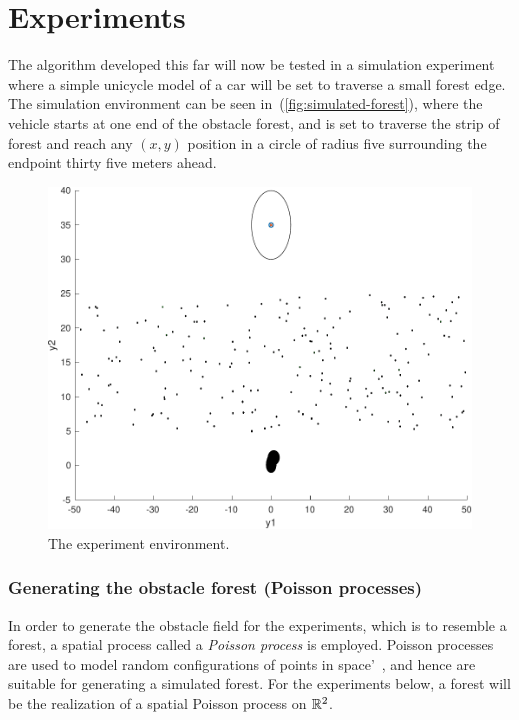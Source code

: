 \chapter{Experiments}

The \rrtfunnel{} algorithm developed this far will now be tested in a simulation
experiment where a simple unicycle model of a car will be set to traverse a
small forest edge. The simulation environment can be seen
in~(\ref{fig:simulated-forest}), where the vehicle starts at one end of the
obstacle forest, and is set to traverse the strip of forest and reach any
\((x,y)\) position in a circle of radius five surrounding the endpoint thirty
five meters ahead.

\begin{figure}
  \centering
  \includegraphics[scale=.5]{figures/experiments/simulated-forest}
  \caption{The experiment environment.}
\end{figure}

\subsection{Generating the obstacle forest (Poisson processes)}
\label{sec:Poisson-Process}

In order to generate the obstacle field for the experiments, which is to
resemble a forest, a spatial process called a \textit{Poisson process} is
employed. Poisson processes are used to model random configurations of points in
space'~\cite{kroeseSpatialProcessGeneration}, and hence are suitable for
generating a simulated forest. For the experiments below, a forest will be the
realization of a spatial Poisson process on \(\mathbb{R}^2\).

